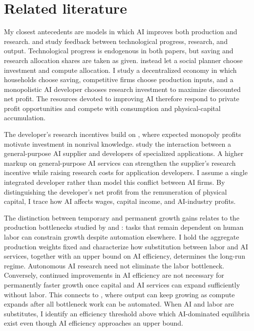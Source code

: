 \section{Related literature}
\label{sec:rewrite-literature}

My closest antecedents are models in which AI improves both production and
research. \citet{davidsonetal2026} and \citet{jonestonetti2026} study
feedback between technological progress, research, and output. Technological
progress is endogenous in both papers, but saving and research allocation
shares are taken as given. \citet{erdiletal2025gate} instead let a social
planner choose investment and compute allocation. I study a decentralized
economy in which households choose saving, competitive firms choose
production inputs, and a monopolistic AI developer chooses research
investment to maximize discounted net profit. The resources devoted to
improving AI therefore respond to private profit opportunities and compete
with consumption and physical-capital accumulation.

The developer's research incentives build on \citet{romer1990}, where
expected monopoly profits motivate investment in nonrival knowledge.
\citet{liuwan2026} study the interaction between a general-purpose AI
supplier and developers of specialized applications. A higher markup on
general-purpose AI services can strengthen the supplier's research incentive
while raising research costs for application developers. I assume a single
integrated developer rather than model this conflict between AI firms.
By distinguishing the developer's net profit
from the remuneration of physical capital, I trace how AI affects wages,
capital income, and AI-industry profits.

The distinction between temporary and permanent growth gains relates to
the production bottlenecks studied by \citet{aghionjonesjones2019} and
\citet{jonestonetti2026}: tasks that remain dependent on human labor can
constrain growth despite automation elsewhere. I hold the aggregate
production weights fixed and characterize how substitution between labor
and AI services, together with an upper bound on AI efficiency, determines
the long-run regime. Autonomous AI research need not eliminate the labor
bottleneck. Conversely, continued improvements in AI efficiency are not
necessary for permanently faster growth once capital and AI services can
expand sufficiently without labor. This connects to \citet{restrepo2025agi},
where output can keep growing as compute expands after all bottleneck work
can be automated. When AI and labor are substitutes, I identify an
efficiency threshold above which AI-dominated equilibria exist even though
AI efficiency approaches an upper bound.

